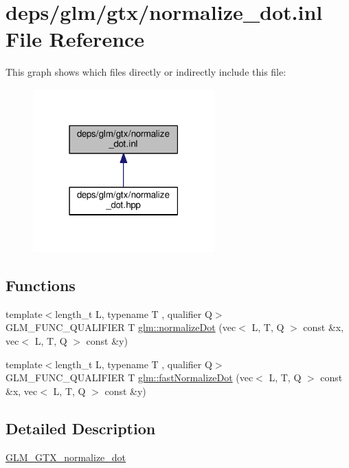 \hypertarget{normalize__dot_8inl}{}\section{deps/glm/gtx/normalize\+\_\+dot.inl File Reference}
\label{normalize__dot_8inl}
This graph shows which files directly or indirectly include this file\+:
\nopagebreak
\begin{figure}[H]
\begin{center}
\leavevmode
\includegraphics[width=198pt]{d0/d9c/normalize__dot_8inl__dep__incl}
\end{center}
\end{figure}
\subsection*{Functions}
\begin{DoxyCompactItemize}
\item 
{\footnotesize template$<$length\+\_\+t L, typename T , qualifier Q$>$ }\\G\+L\+M\+\_\+\+F\+U\+N\+C\+\_\+\+Q\+U\+A\+L\+I\+F\+I\+ER T \hyperlink{group__gtx__normalize__dot_gacb140a2b903115d318c8b0a2fb5a5daa}{glm\+::normalize\+Dot} (vec$<$ L, T, Q $>$ const \&x, vec$<$ L, T, Q $>$ const \&y)
\item 
{\footnotesize template$<$length\+\_\+t L, typename T , qualifier Q$>$ }\\G\+L\+M\+\_\+\+F\+U\+N\+C\+\_\+\+Q\+U\+A\+L\+I\+F\+I\+ER T \hyperlink{group__gtx__normalize__dot_ga2746fb9b5bd22b06b2f7c8babba5de9e}{glm\+::fast\+Normalize\+Dot} (vec$<$ L, T, Q $>$ const \&x, vec$<$ L, T, Q $>$ const \&y)
\end{DoxyCompactItemize}


\subsection{Detailed Description}
\hyperlink{group__gtx__normalize__dot}{G\+L\+M\+\_\+\+G\+T\+X\+\_\+normalize\+\_\+dot} 